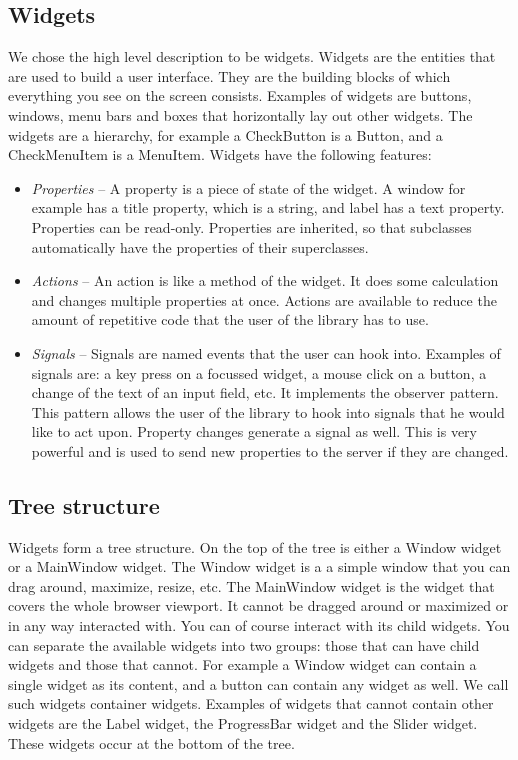 \documentclass[11pt,a4paper]{article}
\begin{document}
\subsection{Widgets}

We chose the high level description to be widgets.
Widgets are the entities that are used to build a user interface.
They are the building blocks of which everything you see on the screen consists.
Examples of widgets are buttons, windows, menu bars and boxes that horizontally lay out other widgets.
The widgets are a hierarchy, for example a CheckButton is a Button, and a CheckMenuItem is a MenuItem.
Widgets have the following features:

\newpage
\begin{itemize}
\item \textit{Properties} -- A property is a piece of state of the widget.
A window for example has a title property, which is a string, and label has a text property.
Properties can be read-only.
Properties are inherited, so that subclasses automatically have the properties of their superclasses.

\item \textit{Actions} -- An action is like a method of the widget.
It does some calculation and changes multiple properties at once.
Actions are available to reduce the amount of repetitive code that the user of the library has to use.

\item \textit{Signals} -- Signals are named events that the user can hook into.
Examples of signals are: a key press on a focussed widget, a mouse click on a button, a change of the text of an input field, etc.
It implements the observer pattern.
This pattern allows the user of the library to hook into signals that he would like to act upon.
Property changes generate a signal as well.
This is very powerful and is used to send new properties to the server if they are changed.
\end{itemize}

\subsection{Tree structure}

Widgets form a tree structure.
On the top of the tree is either a Window widget or a MainWindow widget.
The Window widget is a a simple window that you can drag around, maximize, resize, etc.
The MainWindow widget is the widget that covers the whole browser viewport.
It cannot be dragged around or maximized or in any way interacted with.
You can of course interact with its child widgets.
You can separate the available widgets into two groups: those that can have child widgets and those that cannot.
For example a Window widget can contain a single widget as its content, and a button can contain any widget as well.
We call such widgets container widgets.
Examples of widgets that cannot contain other widgets are the Label widget, the ProgressBar widget and the Slider widget.
These widgets occur at the bottom of the tree.
\end{document}
